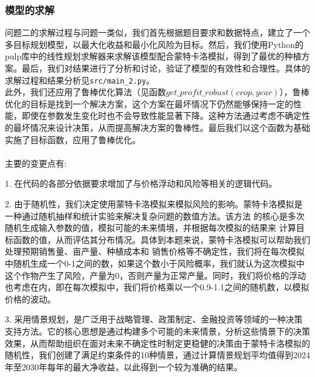 \documentclass[withoutpreface]{cumcmthesis}
\begin{document}
\subsubsection{模型的求解}
问题二的求解过程与问题一类似，我们首先根据题目要求和数据特点，建立了一个多目标规划模型，以最大化收益和最小化风险为目标。然后，我们使用Python的pulp库中的线性规划求解器来求解该模型配合蒙特卡洛模拟，得到了最优的种植方案。最后，我们对结果进行了分析和讨论，验证了模型的有效性和合理性。具体的求解过程和结果分析见\verb|src/main_2.py|。\\

此外，我们还应用了鲁棒优化算法（见函数$ get\_profit\_robust(crop, year) $），鲁棒优化的目标是找到一个解决方案，这个方案在最坏情况下仍然能够保持一定的性能，即使在参数发生变化时也不会导致性能显著下降。这种方法通过考虑不确定性的最坏情况来设计决策，从而提高解决方案的鲁棒性。最后我们以这个函数为基础实施了目标函数，应用了鲁棒优化。\\\\
主要的变更点有:

1. 在代码的各部分依据要求增加了与价格浮动和风险等相关的逻辑代码。

2. 由于随机性，我们决定使用蒙特卡洛模拟来模拟风险的影响。蒙特卡洛模拟是一种通过随机抽样和统计实验来解决复杂问题的数值方法。该方法 的核心是多次随机生成输入参数的值，模拟可能的未来情境，并根据每次模拟的结果来 计算目标函数的值，从而评估其分布情况。具体到本题来说，蒙特卡洛模拟可以帮助我们处理预期销售量、亩产量、种植成本和 销售价格等不确定性，我们将在每次模拟中随机生成一个0-1之间的数，如果这个数小于风险概率，我们就认为这次模拟中这个作物产生了风险，产量为0，否则产量为正常产量。同时，我们将价格的浮动也考虑在内，即在每次模拟中，我们将价格乘以一个0.9-1.1之间的随机数，以模拟价格的波动。

3. 采用情景规划，是广泛用于战略管理、政策制定、金融投资等领域\cite{ref6}的一种决策支持方法。它的核心思想是通过构建多个可能的未来情景，分析这些情景下的决策效果，从而帮助组织在面对未来不确定性时制定更稳健的决策\cite{ref7}由于蒙特卡洛模拟的随机性，我们创建了满足约束条件的10种情景，通过计算情景规划平均值得到2024年至2030年每年的最大净收益，以此得到一个较为准确的结果。
\end{document}
